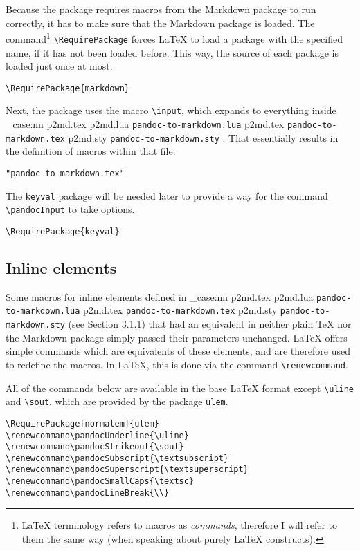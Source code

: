 \documentclass[
  digital,     %
  oneside,     %
  nosansbold,  %
  nocolorbold, %
  lof,         %
  nolot,       %
]{fithesis4}
\newcommand\macro[1]{\texttt{\textbackslash{}{#1}}}
\newcommand\file[1]
  {
    \str_case:nn
      { #1 }
      {
        { p2md.lua } { \texttt{pandoc\hyp{}to\hyp{}markdown.lua} }
        { p2md.tex } { \texttt{pandoc\hyp{}to\hyp{}markdown.tex} }
        { p2md.sty } { \texttt{pandoc\hyp{}to\hyp{}markdown.sty} }
      }
  }
\begin{document}
\noindent
Because the package requires macros from the Markdown package to run correctly, it has to make sure that the Markdown package is loaded. The command\footnote{\LaTeX{} terminology refers to macros as \emph{commands}, therefore I will refer to them the same way (when speaking about purely \LaTeX{} constructs).} \macro{RequirePackage} forces \LaTeX{} to load a package with the specified name, if it has not been loaded before. This way, the source of each package is loaded just once at most.

\noindent
\lstset{language=[LaTeX]TeX}
\begin{lstlisting}
\RequirePackage{markdown}
\end{lstlisting}

\noindent
Next, the package uses the macro \macro{input}, which expands to everything inside \file{p2md.tex}. That essentially results in the definition of macros within that file.

\noindent
\lstset{language=[LaTeX]TeX}
\begin{lstlisting}
"pandoc-to-markdown.tex"
\end{lstlisting}

\noindent
The \texttt{keyval} package will be needed later to provide a way for the command \macro{pandocInput} to take options.

\noindent
\lstset{language=[LaTeX]TeX}
\begin{lstlisting}
\RequirePackage{keyval}
\end{lstlisting}

\subsection{Inline elements}
Some macros for inline elements defined in \file{p2md.tex} (see Section 3.1.1) that had an equivalent in neither plain \TeX{} nor the Markdown package simply passed their parameters unchanged. \LaTeX{} offers simple commands which are equivalents of these elements, and are therefore used to redefine the macros. In \LaTeX{}, this is done via the command \macro{renewcommand}.

All of the commands below are available in the base \LaTeX{} format except \macro{uline} and \macro{sout}, which are provided by the package \texttt{ulem}.

\noindent
\lstset{language=[LaTeX]TeX}
\begin{lstlisting}
\RequirePackage[normalem]{ulem}
\renewcommand\pandocUnderline{\uline}
\renewcommand\pandocStrikeout{\sout}
\renewcommand\pandocSubscript{\textsubscript}
\renewcommand\pandocSuperscript{\textsuperscript}
\renewcommand\pandocSmallCaps{\textsc}
\renewcommand\pandocLineBreak{\\}
\end{lstlisting}
\end{document}
